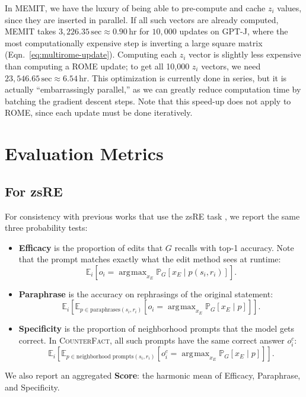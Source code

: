 \documentclass{article} %
\newcommand{\cfd}{\textsc{CounterFact}\xspace}
\newcommand{\method}{MEMIT\xspace}
\DeclareMathOperator*{\argmax}{\arg\!\max}
\newcommand{\exsub}[2]{\mathbb{E}_{#2}\left[ #1 \right]}
\newcommand{\prsub}[2]{\mathbb{P}_{#2}\left[ #1 \right]}
\newcommand{\refeqn}[1]{Eqn.~\ref{eq:#1}}
\newcommand{\iclrnew}[1]{#1}
\begin{document}
In \method, we have the luxury of being able to pre-compute and cache $z_i$ values, since they are inserted in parallel. If all such vectors are already computed, \method takes $3{,}226.35\,\mathrm{sec} \approx 0.90\,\mathrm{hr}$ for $10{,}000$ updates on GPT-J, where the most computationally expensive step is inverting a large square matrix (\refeqn{multirome-update}).
\iclrnew{Computing each $z_i$ vector is slightly less expensive than computing a ROME update; to get all 10{,}000 $z_i$ vectors, we need $23{,}546.65\,\mathrm{sec} \approx 6.54\,\mathrm{hr}$. This optimization is currently done in series, but it is actually ``embarrassingly parallel,'' as we can greatly reduce computation time by batching the gradient descent steps. Note that this speed-up does not apply to ROME, since each update must be done iteratively.}


\section{Evaluation Metrics} \label{apd:metrics}

\subsection{For zsRE}

\iclrnew{

For consistency with previous works that use the zsRE task \citep{mend, meng2022locating}, we report the same three probability tests:

\begin{itemize}[leftmargin=12pt, topsep=0pt]
    \item \textbf{Efficacy} is the proportion of edits that $G$ recalls with top-1 accuracy. Note that the prompt matches exactly what the edit method sees at runtime:
    \begin{equation}
        \exsub{o_i = \argmax_{x_E} \prsub{x_E \mid p(s_i, r_i)}{G}}{i}.
    \end{equation}
    
    \item \textbf{Paraphrase} is the accuracy on rephrasings of the original statement:
    \begin{equation}
        \exsub{\exsub{o_i = \argmax_{x_E} \prsub{x_E \mid p}{G}}{p \in \text{paraphrases}(s_i, r_i)}}{i}.
    \end{equation}
    
    \item \textbf{Specificity} is the proportion of neighborhood prompts that the model gets correct. In \cfd, all such prompts have the same correct answer $o_i^c$:
    \begin{equation}
        \exsub{\exsub{o_i^c = \argmax_{x_E} \prsub{x_E \mid p}{G}}{p \in \text{neighborhood prompts}(s_i, r_i)}}{i}.
    \end{equation}
\end{itemize}

We also report an aggregated \textbf{Score}: the harmonic mean of Efficacy, Paraphrase, and Specificity.

}
\end{document}

